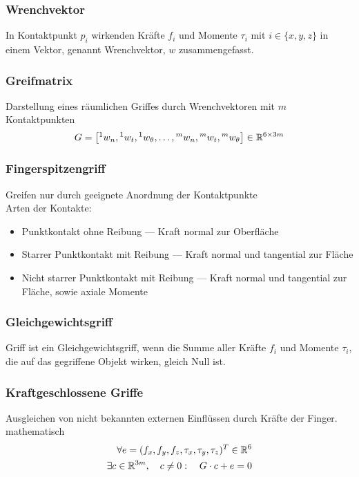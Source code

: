 \subsubsection{Wrenchvektor}
In Kontaktpunkt \(p_i\) wirkenden Kräfte \(f_i\) und Momente \(\tau_i\) mit \(i \in \{x, y, z\}\) in einem Vektor,
genannt Wrenchvektor, \(w\) zusammengefasst.

\subsubsection{Greifmatrix}
Darstellung eines räumlichen Griffes durch Wrenchvektoren mit \(m\) Kontaktpunkten
\[G = \left[ {}^1w_n, {}^1w_t, {}^1w_{\theta}, \ldots, {}^mw_n, {}^mw_t, {}^mw_{\theta}\right] \in \mathbb{R}^{6\times3m}\]

\subsubsection{Fingerspitzengriff}
Greifen nur durch geeignete Anordnung der Kontaktpunkte\\
Arten der Kontakte:
\begin{itemize}
\item Punktkontakt ohne Reibung --- Kraft normal zur Oberfläche
\item Starrer Punktkontakt mit Reibung --- Kraft normal und tangential zur Fläche
\item Nicht starrer Punktkontakt mit Reibung --- Kraft normal und tangential zur Fläche, sowie axiale Momente
\end{itemize}

\subsubsection{Gleichgewichtsgriff}
Griff ist ein Gleichgewichtsgriff, wenn die Summe aller Kräfte \(f_i\) und Momente \(\tau_i\), die auf das gegriffene
Objekt wirken, gleich Null ist.

\subsubsection{Kraftgeschlossene Griffe}
Ausgleichen von nicht bekannten externen Einflüssen durch Kräfte der Finger.\\
mathematisch
\begin{align}
  \forall e = (f_x, f_y, f_z, \tau_x, \tau_y, \tau_z)^T \in \mathbb{R}^6 \\
  \exists c \in \mathbb{R}^{3m}, \quad c \neq 0: \quad G \cdot c + e = 0
\end{align}

